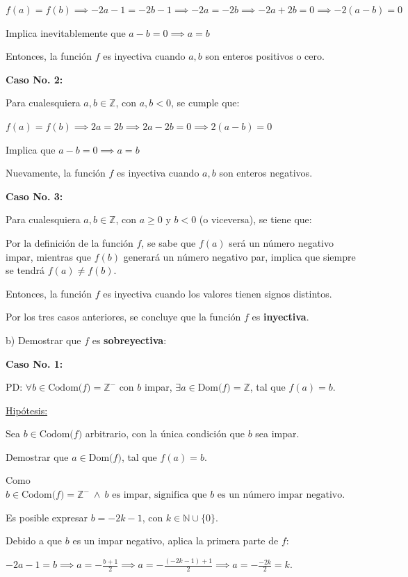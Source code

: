 \documentclass{article}
\begin{document}
$f(a) = f(b) \implies -2a - 1 = -2b - 1 \implies -2a = -2b \implies -2a + 2b = 0 \implies -2(a - b) = 0$

Implica inevitablemente que $a - b = 0 \implies a = b$

Entonces, la función $f$ es inyectiva cuando $a, b$ son enteros positivos o cero.

\textbf{Caso No. 2:}

Para cualesquiera $a, b \in \mathbb{Z}$, con $a, b < 0$, se cumple que:

$f(a) = f(b) \implies 2a = 2b \implies 2a - 2b = 0 \implies 2(a - b) = 0$

Implica que $a - b = 0 \implies a = b$

Nuevamente, la función $f$ es inyectiva cuando $a, b$ son enteros negativos.

\textbf{Caso No. 3:}

Para cualesquiera $a, b \in \mathbb{Z}$, con $a \ge 0 \text{ y } b < 0$ (o viceversa), se tiene que:

Por la definición de la función $f$, se sabe que $f(a)$ será un número negativo impar, mientras que $f(b)$ generará un número negativo par, implica que siempre se tendrá $f(a) \neq f(b)$.

Entonces, la función $f$ es inyectiva cuando los valores tienen signos distintos.

Por los tres casos anteriores, se concluye que la función $f$ es \textbf{inyectiva}.

b) Demostrar que $f$ es \textbf{sobreyectiva}:

\textbf{Caso No. 1:}

PD: $\forall b \in \text{Codom($f$)} = \mathbb{Z}^-$ con $b$ impar, $\exists a \in \text{Dom($f$)} = \mathbb{Z}$, tal que $f(a) = b$.

\newpage
\underline{Hipótesis:}

Sea $b \in \text{Codom($f$)}$ arbitrario, con la única condición que $b$ sea impar.

Demostrar que $a \in \text{Dom($f$)}$, tal que $f(a) = b$.

Como $b \in \text{Codom($f$)} = \mathbb{Z}^- \ \land \ b \text{ es impar, significa que $b$ es un número impar negativo}.$ 

Es posible expresar $b = -2k - 1$, con $k \in \mathbb{N} \cup \{0\}$.

Debido a que $b$ es un impar negativo, aplica la primera parte de $f$:

$\displaystyle -2a - 1 = b \implies a = -\frac{b + 1}{2} \implies a = -\frac{(-2k - 1) + 1}{2} \implies a = -\frac{-2k}{2} = k$.
\end{document}
